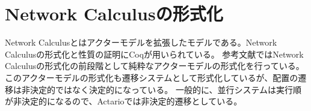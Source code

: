 \section{Network Calculusの形式化}

Network Calculus\cite{Garnock-Jones:2014aa}とはアクターモデルを拡張したモデルである。Network Calculusの形式化と性質の証明にCoqが用いられている。
参考文献\cite{Garnock-Jones:2014aa}ではNetwork Calculusの形式化の前段階として純粋なアクターモデルの形式化を行っている。
このアクターモデルの形式化も遷移システムとして形式化しているが、配置の遷移は非決定的ではなく決定的になっている。
一般的に、並行システムは実行順が非決定的になるので、Actarioでは非決定的遷移としている。

